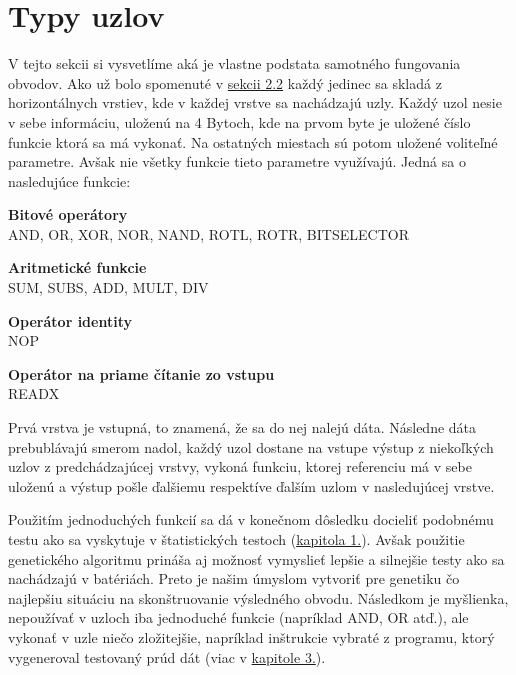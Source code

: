 \section{Typy uzlov}
\label{sec:nodes}

V tejto sekcii si vysvetlíme aká je vlastne podstata samotného fungovania obvodov. Ako už bolo spomenuté v \hyperref[sec:genetics]{sekcii 2.2} každý jedinec sa skladá z horizontálnych vrstiev, kde v každej vrstve sa nachádzajú uzly. Každý uzol nesie v sebe informáciu, uloženú na 4 Bytoch, kde na prvom byte je uložené číslo funkcie ktorá sa má vykonať. Na ostatných miestach sú potom uložené voliteľné parametre. Avšak nie všetky funkcie tieto parametre využívajú. Jedná sa o nasledujúce funkcie:

\begin{myItemize}
	\item \textbf{Bitové operátory}\\AND, OR, XOR, NOR, NAND, ROTL, ROTR, BITSELECTOR
	\item \textbf{Aritmetické funkcie}\\SUM, SUBS, ADD, MULT, DIV
	\item \textbf{Operátor identity}\\NOP
	\item \textbf{Operátor na priame čítanie zo vstupu}\\READX
\end{myItemize}
Prvá vrstva je vstupná, to znamená, že sa do nej nalejú dáta. Následne dáta prebublávajú smerom nadol, každý uzol dostane na vstupe výstup z niekoľkých uzlov z predchádzajúcej vrstvy, vykoná funkciu, ktorej referenciu má v sebe uloženú a výstup pošle ďalšiemu respektíve ďalším uzlom v nasledujúcej vrstve. 

Použitím jednoduchých funkcií sa dá v konečnom dôsledku docieliť podobnému testu ako sa vyskytuje v štatistických testoch (\hyperref[chap:statistic-tests]{kapitola 1.}). Avšak použitie genetického algoritmu prináša aj možnosť vymyslieť lepšie a silnejšie testy ako sa nachádzajú v batériách. Preto je našim úmyslom vytvoriť pre genetiku čo najlepšiu situáciu na skonštruovanie výsledného obvodu. Následkom je myšlienka, nepoužívať v uzloch iba jednoduché funkcie (napríklad AND, OR atď.), ale vykonať v uzle niečo zložitejšie, napríklad inštrukcie vybraté z programu, ktorý vygeneroval testovaný prúd dát (viac v \hyperref[chap:eacirc-jvmsim]{kapitole 3.}).

